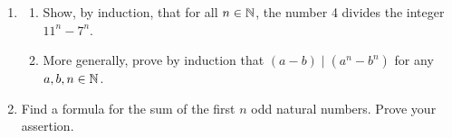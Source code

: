 \begin{exercises}{}{}
\begin{enumerate}
		\item\begin{enumerate}
		  \item Show, by induction, that for all $n\in\mathbb{N}$, the number 4 divides the integer $11^n-7^n$.
			\item More generally, prove by induction that $(a-b)\mid (a^n-b^n)$ for any $a,b,n\in\mathbb{N}$.
		\end{enumerate}
	
	
		\item Find a formula for the sum of the first $n$ odd natural numbers. Prove your assertion.

  
  


\end{enumerate}
\end{exercises}
